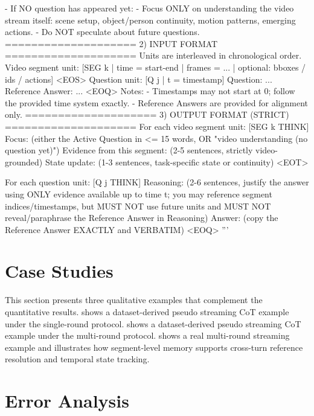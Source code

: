 \documentclass{article}
\begin{document}
\begin{PromptBox}
- If NO question has appeared yet:
  - Focus ONLY on understanding the video stream itself: scene setup, object/person continuity,
    motion patterns, emerging actions.
  - Do NOT speculate about future questions.
====================
2) INPUT FORMAT
====================
Units are interleaved in chronological order.
Video segment unit:
[SEG k | time = start-end | frames = ... | optional: bboxes / ids / actions] <EOS>
Question unit:
[Q j | t = timestamp]
Question: ...
Reference Answer: ...
<EOQ>
Notes:
- Timestamps may not start at 0; follow the provided time system exactly.
- Reference Answers are provided for alignment only.
====================
3) OUTPUT FORMAT (STRICT)
====================
For each video segment unit:
[SEG k THINK]
Focus: (either the Active Question in <= 15 words, OR "video understanding (no question yet)")
Evidence from this segment: (2-5 sentences, strictly video-grounded)
State update: (1-3 sentences, task-specific state or continuity)
<EOT>

For each question unit:
[Q j THINK]
Reasoning: (2-6 sentences, justify the answer using ONLY evidence available up to time t;
           you may reference segment indices/timestamps, but MUST NOT use future units
           and MUST NOT reveal/paraphrase the Reference Answer in Reasoning)
Answer: (copy the Reference Answer EXACTLY and VERBATIM)
<EOQ>
'''
\end{PromptBox}

\section{Case Studies}
\label{app:Study_Case}

This section presents three qualitative examples that complement the quantitative results.  shows a dataset-derived pseudo streaming CoT example under the single-round protocol.  shows a dataset-derived pseudo streaming CoT example under the multi-round protocol.  shows a real multi-round streaming example and illustrates how segment-level memory supports cross-turn reference resolution and temporal state tracking.

\section{Error Analysis}
\label{app:error}
\end{document}
